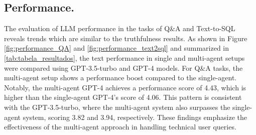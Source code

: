             
            
            
        \subsection{Performance.}        
            The evaluation of LLM performance \cite{Li2023} in the tasks of Q\&A and Text-to-SQL reveals trends which are similar to the truthfulness results. As shown in Figure \ref{fig:performance_QA} and \ref{fig:performance_text2sql} and summarized in \ref{tab:tabela_resultados}, the text performance in single and multi-agent setups were compared using GPT-3.5-turbo and GPT-4 models.        
            For Q\&A tasks, the multi-agent setup shows a performance boost compared to the single-agent. Notably, the multi-agent GPT-4 achieves a performance score of 4.43, which is higher than the single-agent GPT-4’s score of 4.06. This pattern is consistent with the GPT-3.5-turbo, where the multi-agent system also surpasses the single-agent system, scoring 3.82 and 3.94, respectively. These findings emphasize the effectiveness of the multi-agent approach in handling technical user queries.
                    

